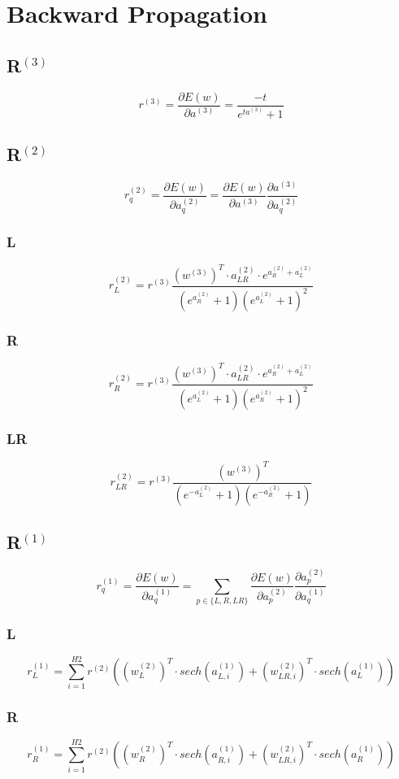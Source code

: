 \documentclass[11pt]{article}
\begin{document}
\section*{Backward Propagation}
\subsection*{R$^{(3)}$}
$$r^{(3)}=\frac{\partial E(w)}{\partial a^{(3)}} = \frac{-t}{e^{ta^{(3)}}+1}$$

\subsection*{R$^{(2)}$}
$$ r^{(2)}_{q} = \frac{\partial E(w)}{\partial a^{(2)}_q} = \frac{\partial E(w)}{\partial a^{(3)}}\frac{\partial a^{(3)}}{\partial a^{(2)}_q}  $$
\subsubsection*{L}
$$r^{(2)}_{L} = r^{(3)} \frac{(w^{(3)})^T \cdot a_{LR}^{(2)} \cdot e^{a_R^{(2)}+a_L^{(2)}}}{(e^{a_R^{(2)}}+1)(e^{a_L^{(2)}}+1)^2}$$

\subsubsection*{R}
$$r^{(2)}_{R} =r^{(3)} \frac{(w^{(3)})^T \cdot a_{LR}^{(2)} \cdot e^{a_R^{(2)}+a_L^{(2)}}}{(e^{a_L^{(2)}}+1)(e^{a_R^{(2)}}+1)^2}$$

\subsubsection*{LR}
$$r^{(2)}_{LR} =r^{(3)} \frac{(w^{(3)})^T}{(e^{-a_L^{(2)}}+1)(e^{-a_R^{(2)}}+1)}$$

\subsection*{R$^{(1)}$}
$$ r^{(1)}_{q} = \frac{\partial E(w)}{\partial a^{(1)}_q} = \sum_{p\in\{L, R, LR\}} \frac{\partial E(w)}{\partial a_p^{(2)}}\frac{\partial a^{(2)}_p}{\partial a^{(1)}_q}  $$
\subsubsection*{L}
$$r^{(1)}_{L} = \sum_{i=1}^{H2} r^{(2)} ( (w_{L}^{(2)})^T\cdot sech(a_{L,i}^{(1)}) + (w_{LR,i}^{(2)})^T\cdot sech(a_{L}^{(1)}) ) $$

\subsubsection*{R}
$$r^{(1)}_{R} =  \sum_{i=1}^{H2}  r^{(2)} ( (w_{R}^{(2)})^T\cdot sech(a_{R,i}^{(1)}) + (w_{LR,i}^{(2)})^T\cdot sech(a_{R}^{(1)}) ) $$
\end{document}
